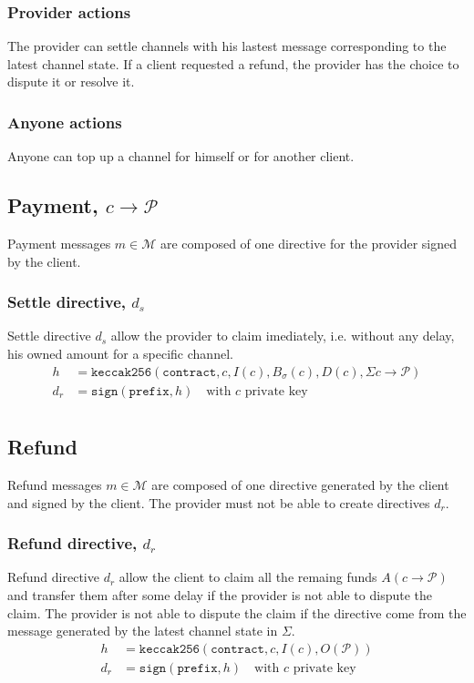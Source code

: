 \documentclass{llncs}
\begin{document}
\subsubsection{Provider actions} The provider can settle channels with his lastest message corresponding to the latest channel state. If a client requested a refund, the provider has the choice to dispute it or resolve it.

\subsubsection{Anyone actions} Anyone can top up a channel for himself or for another client.

\subsection{Payment, $c \rightarrow \mathcal{P}$} Payment messages $m \in \mathcal{M}$ are composed of one directive for the provider signed by the client.

\subsubsection{Settle directive, $d_s$} Settle directive $d_s$ allow the provider to claim imediately, i.e. without any delay, his owned amount for a specific channel.
\begin{equation*}
\begin{split}
    h &= \texttt{keccak256}(\texttt{contract},c,I(c),B_\sigma(c),D(c),\textstyle\Sigma c \rightarrow \mathcal{P}) \\
    d_r &= \texttt{sign}(\texttt{prefix}, h) \quad \text{with $c$ private key} \\
\end{split}
\end{equation*}

\subsection{Refund} Refund messages $m \in \mathcal{M}$ are composed of one directive generated by the client and signed by the client. The provider must not be able to create directives $d_r$.

\subsubsection{Refund directive, $d_r$} Refund directive $d_r$ allow the client to claim all the remaing funds $A(c \rightarrow \mathcal{P})$ and transfer them after some delay if the provider is not able to dispute the claim. The provider is not able to dispute the claim if the directive come from the message generated by the latest channel state in $\Sigma$.
\begin{equation*}
\begin{split}
    h &= \texttt{keccak256}(\texttt{contract},c,I(c),O(\mathcal{P})) \\
    d_r &= \texttt{sign}(\texttt{prefix}, h) \quad \text{with $c$ private key} \\
\end{split}
\end{equation*}
\end{document}
